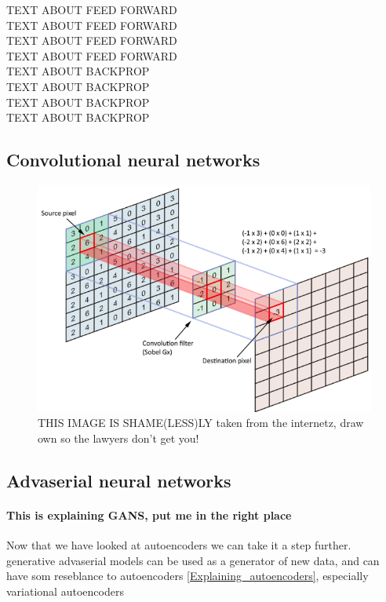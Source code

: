 	
	TEXT ABOUT FEED FORWARD\\
	TEXT ABOUT FEED FORWARD\\
	TEXT ABOUT FEED FORWARD\\
	TEXT ABOUT FEED FORWARD\\

	TEXT ABOUT BACKPROP\\
	TEXT ABOUT BACKPROP\\
	TEXT ABOUT BACKPROP\\
	TEXT ABOUT BACKPROP\\
	
    \subsection{Convolutional neural networks}
	\begin{figure}[ht!]
	    \centering
	    \includegraphics[scale=0.2]{background/figures/conv_neural_network.png}
	    \caption{THIS IMAGE IS SHAME(LESS)LY taken from the internetz, draw own so the lawyers don't get you!}
	\end{figure}
    
    \subsection{Advaserial neural networks}
  	  	\paragraph{This is explaining GANS, put me in the right place} %
	  Now that we have looked at autoencoders we can take it a step further. 
	  generative advaserial models can be used as a generator of new data, and can have som reseblance to autoencoders \ref{Explaining_autoencoders}, especially variational autoencoders %
	  
